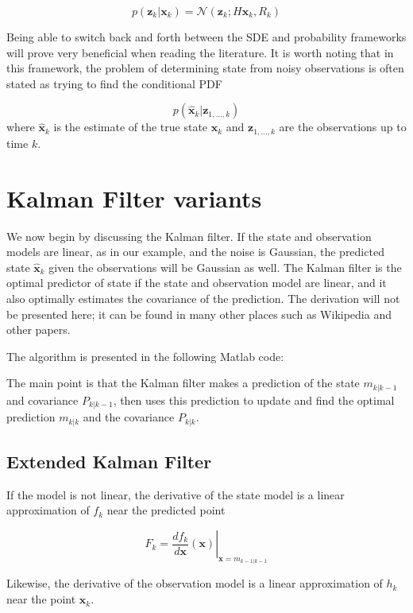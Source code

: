 \documentclass{article}
\begin{document}
\[p(\mathbf{z}_k|\mathbf{x}_k) = \mathcal{N}(\mathbf{z}_k ; H\mathbf{x}_{k}, R_k)\]

Being able to switch back and forth between the SDE and probability frameworks
will prove very beneficial when reading the literature.  It is worth noting
that in this framework, the problem of determining state from noisy observations
is often stated as trying to find the conditional PDF

\[p(\mathbf{\hat{x}}_k|\mathbf{z}_{1,\ldots,k})\]
where $\mathbf{\hat{x}}_k$ is the estimate of the true state $\mathbf{x}_k$ and 
$\mathbf{z}_{1,\ldots,k}$ are the observations up to time $k$.

\section{Kalman Filter variants}

We now begin by discussing the Kalman filter.  If the state and observation 
models are linear, as in our example, and the noise is Gaussian, the predicted
state $\mathbf{\hat{x}}_k$ given the observations will be Gaussian as well.
The Kalman filter is the optimal predictor of state if the state and 
observation model are linear, and it also optimally estimates the 
covariance of the prediction.  The derivation will not be presented here; it 
can be found in many other places such as Wikipedia and other papers.

The algorithm is presented in the following Matlab code:



The main point is that the Kalman filter makes a prediction of the state
$m_{k|k-1}$ and covariance $P_{k|k-1}$, then uses this prediction to update
and find the optimal prediction $m_{k|k}$ and the covariance $P_{k|k}$.

\subsection{Extended Kalman Filter}

If the model is not linear, the derivative of the state model is a linear 
approximation of $f_k$ near the predicted point 

\[ F_k = \left.\frac{df_k}{d\mathbf{x}}(\mathbf{x})\right|_{\mathbf{x} = m_{k-1|k-1}} \]

Likewise, the derivative of the observation model is a linear approximation
of $h_k$ near the point $\mathbf{x}_k$.
\end{document}
